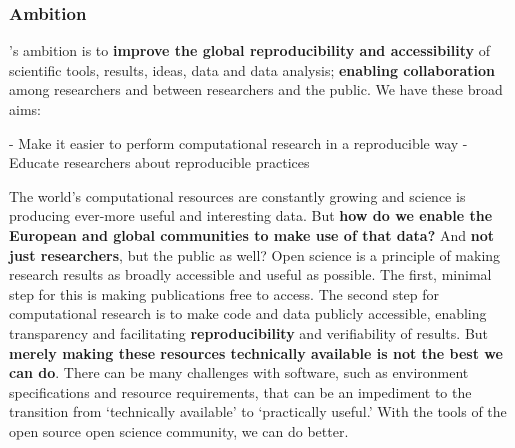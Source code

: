 
\subsubsection{Ambition}



\TheProject's ambition is to \textbf{improve the global reproducibility and accessibility} of scientific
tools, results, ideas, data and data analysis;
\textbf{enabling collaboration} among researchers and between researchers and the public.
We have these broad aims:

- Make it easier to perform computational research in a reproducible way
- Educate researchers about reproducible practices

The world's computational resources are
constantly growing and science is producing ever-more useful and
interesting data.  But \textbf{how do we enable the European and global
communities to make use of that data?}  And \textbf{not just researchers}, but
the public as well?  Open science is a principle of making research
results as broadly accessible and useful as possible.  The first,
minimal step for this is making publications free to access.  The
second step for computational research is to make code and data
publicly accessible, enabling transparency and facilitating
\textbf{reproducibility} and verifiability of results.  But \textbf{merely making these
resources technically available is not the best we can do}.  There can
be many challenges with software, such as environment specifications
and resource requirements, that can be an impediment to the transition
from `technically available' to `practically useful.'  With the tools
of the open source open science community, we can do better.


